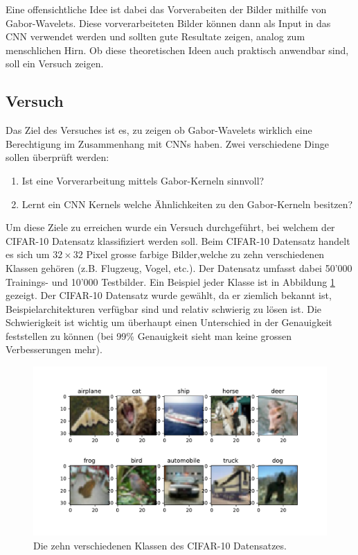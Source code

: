 Eine offensichtliche Idee ist dabei das Vorverabeiten der Bilder mithilfe von Gabor-Wavelets.
Diese vorverarbeiteten Bilder können dann als Input in das CNN verwendet werden und sollten gute Resultate zeigen, analog zum menschlichen Hirn.
Ob diese theoretischen Ideen auch praktisch anwendbar sind, soll ein Versuch zeigen.

\subsection{Versuch}

Das Ziel des Versuches ist es, zu zeigen ob Gabor-Wavelets wirklich eine Berechtigung im Zusammenhang mit CNNs haben.
Zwei verschiedene Dinge sollen überprüft werden:
\begin{enumerate}
	\item Ist eine Vorverarbeitung mittels Gabor-Kerneln sinnvoll?
	\item Lernt ein CNN Kernels welche Ähnlichkeiten zu den Gabor-Kerneln besitzen?
\end{enumerate}
Um diese Ziele zu erreichen wurde ein Versuch durchgeführt, bei welchem der CIFAR-10 \cite{paper:cifar10} Datensatz klassifiziert werden soll.
Beim CIFAR-10 Datensatz handelt es sich um $32 \times 32$ Pixel grosse farbige Bilder,welche zu zehn verschiedenen Klassen gehören (z.B. Flugzeug, Vogel, etc.).
Der Datensatz umfasst dabei 50'000 Trainings- und 10'000 Testbilder.
Ein Beispiel jeder Klasse ist in Abbildung \ref{fig:cifar10} gezeigt.
Der CIFAR-10 Datensatz wurde gewählt, da er ziemlich bekannt ist, Beispielarchitekturen verfügbar sind und relativ schwierig zu lösen ist.
Die Schwierigkeit ist wichtig um überhaupt einen Unterschied in der Genauigkeit feststellen zu können (bei 99\% Genauigkeit sieht man keine grossen Verbesserungen mehr).

\begin{figure}
	\centering
	\includegraphics[width=0.6\linewidth, trim=0 60 0 40, clip]{./papers/visuell/images/cifar10}
	\caption{Die zehn verschiedenen Klassen des CIFAR-10 Datensatzes.}
	\label{fig:cifar10}
\end{figure}


